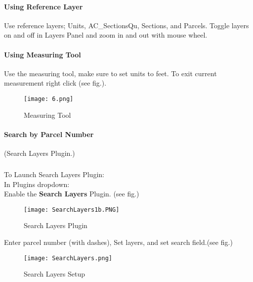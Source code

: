 \documentclass[class=book , crop=false]{standalone}
\begin{document}
\paragraph{Using Reference Layer}
\large Use reference layers; Units, AC\_SectionsQu, Sections, and Parcels.  Toggle layers on and off in Layers Panel and zoom in and out with mouse wheel.
\clearpage

\paragraph{Using Measuring Tool}
\large Use the measuring tool, make sure to set units to feet.  To exit current measurement right click (see fig.).
\begin{figure}[H]
\begin{center}
\texttt{[image: 6.png]}
\end{center}
\caption{Measuring Tool}
\end{figure}							
\clearpage
			
\paragraph{Search by Parcel Number}
\small (Search Layers Plugin.)
\subparagraph{}
To Launch Search Layers Plugin:\\In Plugins dropdown:\\Enable the \textbf{Search Layers} Plugin. (see fig.)		
\begin{figure}[H]
\begin{center}
\texttt{[image: SearchLayers1b.PNG]}
\end{center}
\caption{Search Layers Plugin}
\end{figure}
\bigskip
Enter parcel number {\tiny (with dashes)}, Set layers, and set search field.(see fig.) 
\begin{figure}[H]						
\begin{center}
\texttt{[image: SearchLayers.png]}
\end{center}
\caption{Search Layers Setup}
\end{figure}
											
\clearpage			
			
\end{document}
